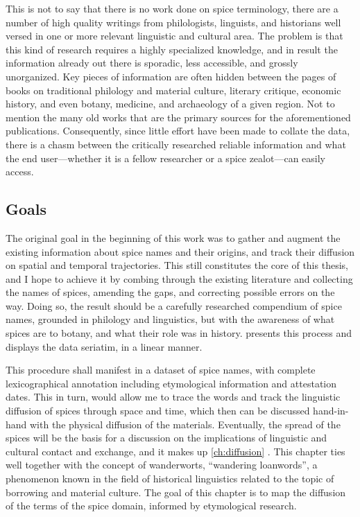 This is not to say that there is no work done on spice terminology, there are a number of high quality writings from philologists, linguists, and historians well versed in one or more relevant linguistic and cultural area. The problem is that this kind of research requires a highly specialized knowledge, and in result the information already out there is sporadic, less accessible, and grossly unorganized. Key pieces of information are often hidden between the pages of books on traditional philology and material culture, literary critique, economic history, and even botany, medicine, and archaeology of a given region. Not to mention the many old works that are the primary sources for the aforementioned publications. Consequently, since little effort have been made to collate the data, there is a chasm between the critically researched reliable information and what the end user---whether it is a fellow researcher or a spice zealot---can easily access.



\subsection{Goals}

The original goal in the beginning of this work was to gather and augment the existing information about spice names and their origins, and track their diffusion on spatial and temporal trajectories. This still constitutes the core of this thesis, and I hope to achieve it by combing through the existing literature and collecting the names of spices, amending the gaps, and correcting possible errors on the way. Doing so, the result should be a carefully researched compendium of spice names, grounded in philology and linguistics, but with the awareness of what spices are to botany, and what their role was in history.   presents this process and displays the data seriatim, in a linear manner. 

This procedure shall manifest in a dataset of spice names, with complete lexicographical annotation including etymological information and attestation dates. This in turn, would allow me to trace the words and track the linguistic diffusion of spices through space and time, which then can be discussed hand-in-hand with the physical diffusion of the materials. Eventually, the spread of the spices will be the basis for a discussion on the implications of linguistic and cultural contact and exchange, and it makes up \cref{ch:diffusion} . This chapter ties well together with the concept of \glspl{wanderwort}, ``wandering loanwords'', a phenomenon known in the field of historical linguistics related to the topic of borrowing and material culture. The goal of this chapter is to map the diffusion of the terms of the spice domain, informed by etymological research.

